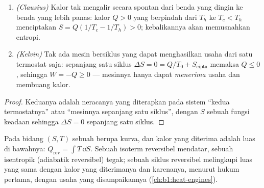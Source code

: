 \begin{proposition}\label{prop:b1:second-law-entropy:clausiuskelvin}
\begin{enumerate}
  \item \emph{(Clausius)} Kalor tak mengalir secara spontan dari benda yang
        dingin ke benda yang lebih panas: kalor $Q > 0$ yang berpindah dari $T_h$ ke
        $T_c < T_h$ menciptakan $S = Q(1/T_c - 1/T_h) > 0$; kebalikannya akan
        memusnahkan entropi.
  \item \emph{(Kelvin)} Tak ada mesin bersiklus yang dapat menghasilkan usaha dari satu
        termostat saja: sepanjang satu siklus $\Delta S = 0 = Q/T_0 + S_{\mathrm{cipta}}$
        memaksa $Q \leq 0$, sehingga $W = -Q \geq 0$ --- mesinnya hanya dapat
        \emph{menerima} usaha dan membuang kalor.
\end{enumerate}
\end{proposition}

\begin{proof}
Keduanya adalah neracanya yang diterapkan pada sistem ``kedua termostatnya'' atau
``mesinnya sepanjang satu siklus'', dengan $S$ sebuah fungsi keadaan sehingga $\Delta S
= 0$ sepanjang satu siklus.
\end{proof}

\begin{definition}\label{def:b1:second-law-entropy:TS}
Pada bidang $(S, T)$ sebuah  berupa kurva, dan
kalor yang diterima adalah luas di bawahnya: $Q_{\mathrm{rev}} = \int T\,\dd S$. Sebuah
isoterm reversibel mendatar, sebuah isentropik (adiabatik reversibel)
tegak; sebuah siklus reversibel melingkupi luas yang sama dengan kalor yang diterimanya
dan karenanya, menurut hukum pertama, dengan usaha yang disampaikannya
(\cref{ch:b1:heat-engines}).
\end{definition}

